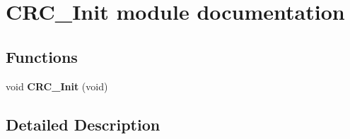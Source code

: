 \hypertarget{group___c_r_c___init__module}{}\section{C\+R\+C\+\_\+\+Init module documentation}
\label{group___c_r_c___init__module}
\subsection*{Functions}
\begin{DoxyCompactItemize}
\item 
void {\bfseries C\+R\+C\+\_\+\+Init} (void)\hypertarget{group___c_r_c___init__module_gac2ead070782f12f510410ad898432147}{}\label{group___c_r_c___init__module_gac2ead070782f12f510410ad898432147}

\end{DoxyCompactItemize}


\subsection{Detailed Description}

